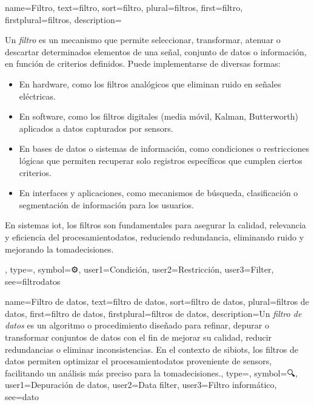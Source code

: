 	{
		name={Filtro},
		text={filtro},
		sort={filtro},
		plural={filtros},
		first={filtro},
		firstplural={filtros},
		description={Un \emph{filtro} es un mecanismo que permite seleccionar, transformar, atenuar o descartar determinados elementos de una se{\~n}al, conjunto de \glspl{dato} o informaci{\'o}n, en funci{\'o}n de criterios definidos. Puede implementarse de diversas formas: 
			\begin{itemize}
				\item En \gls{hardware}, como los filtros anal{\'o}gicos que eliminan ruido en se{\~n}ales el{\'e}ctricas.
				\item En software, como los filtros digitales (media m{\'o}vil, Kalman, Butterworth) aplicados a \glspl{dato} capturados por \glspl{sensor}.
				\item En bases de datos o sistemas de informaci{\'o}n, como condiciones o restricciones l{\'o}gicas que permiten recuperar solo registros espec{\'i}ficos que cumplen ciertos criterios.
				\item En interfaces y aplicaciones, como mecanismos de b{\'u}squeda, clasificaci{\'o}n o segmentaci{\'o}n de informaci{\'o}n para los usuarios.
			\end{itemize}
			En sistemas \gls{iot}, los filtros son fundamentales para asegurar la calidad, relevancia y eficiencia del \gls{procesamientodatos}, reduciendo redundancia, eliminando ruido y mejorando la \gls{tomadecisiones}.},
		type=\glsdefaulttype,
		symbol={⚙️},
		user1={Condici{\'o}n},
		user2={Restricci{\'o}n},
		user3={Filter},
		see={filtrodatos}
	}
	
	{
		name={Filtro de datos},
		text={filtro de datos},
		sort={filtro de datos},
		plural={filtros de datos},
		first={filtro de datos},
		firstplural={filtros de datos},
		description={Un \emph{filtro de datos} es un algoritmo o procedimiento dise{\~n}ado para refinar, depurar o transformar conjuntos de \glspl{dato} con el fin de mejorar su calidad, reducir redundancias o eliminar inconsistencias. En el contexto de \glspl{sibiot}, los filtros de datos permiten optimizar el \gls{procesamientodatos} proveniente de \glspl{sensor}, facilitando un an{\'a}lisis m{\'a}s preciso para la \gls{tomadecisiones}.},
		type=\glsdefaulttype,
		symbol={🔍},
		user1={Depuraci{\'o}n de datos},
		user2={Data filter},
		user3={Filtro inform{\'a}tico},
		see={dato}
	}
	
